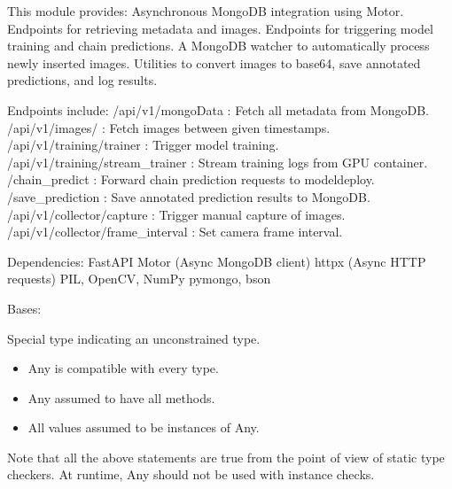\documentclass[letterpaper,10pt,english]{sphinxmanual}
\begin{document}
\sphinxAtStartPar
This module provides:
\sphinxhyphen{} Asynchronous MongoDB integration using Motor.
\sphinxhyphen{} Endpoints for retrieving metadata and images.
\sphinxhyphen{} Endpoints for triggering model training and chain predictions.
\sphinxhyphen{} A MongoDB watcher to automatically process newly inserted images.
\sphinxhyphen{} Utilities to convert images to base64, save annotated predictions, and log results.

\sphinxAtStartPar
Endpoints include:
\sphinxhyphen{} /api/v1/mongoData          : Fetch all metadata from MongoDB.
\sphinxhyphen{} /api/v1/images/            : Fetch images between given timestamps.
\sphinxhyphen{} /api/v1/training/trainer   : Trigger model training.
\sphinxhyphen{} /api/v1/training/stream\_trainer : Stream training logs from GPU container.
\sphinxhyphen{} /chain\_predict             : Forward chain prediction requests to model\sphinxhyphen{}deploy.
\sphinxhyphen{} /save\_prediction           : Save annotated prediction results to MongoDB.
\sphinxhyphen{} /api/v1/collector/capture  : Trigger manual capture of images.
\sphinxhyphen{} /api/v1/collector/frame\_interval : Set camera frame interval.

\sphinxAtStartPar
Dependencies:
\sphinxhyphen{} FastAPI
\sphinxhyphen{} Motor (Async MongoDB client)
\sphinxhyphen{} httpx (Async HTTP requests)
\sphinxhyphen{} PIL, OpenCV, NumPy
\sphinxhyphen{} pymongo, bson

\begin{fulllineitems}
\label{\detokenize{modules/src.pig_sorting_api.main:src.pig_sorting_api.main.Any}}
\pysigstartsignatures
\pysiglinewithargsret
{}
{\sphinxparamcomma {}}
{}
\pysigstopsignatures
\sphinxAtStartPar
Bases: 

\sphinxAtStartPar
Special type indicating an unconstrained type.
\begin{itemize}
\item {} 
\sphinxAtStartPar
Any is compatible with every type.

\item {} 
\sphinxAtStartPar
Any assumed to have all methods.

\item {} 
\sphinxAtStartPar
All values assumed to be instances of Any.

\end{itemize}

\sphinxAtStartPar
Note that all the above statements are true from the point of view of
static type checkers. At runtime, Any should not be used with instance
checks.

\end{fulllineitems}
\end{document}
